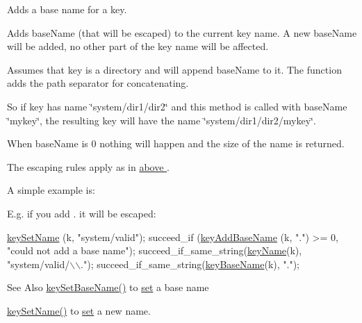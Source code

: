 Adds a base name for a key. 

Adds {\ttfamily base\-Name} (that will be escaped) to the current key name.  A new base\-Name will be added, no other part of the key name will be affected.

Assumes that {\ttfamily key} is a directory and will append {\ttfamily base\-Name} to it. The function adds the path separator for concatenating.

So if {\ttfamily key} has name {\ttfamily \char`\"{}system/dir1/dir2\char`\"{}} and this method is called with {\ttfamily base\-Name} {\ttfamily \char`\"{}mykey\char`\"{}}, the resulting key will have the name {\ttfamily \char`\"{}system/dir1/dir2/mykey\char`\"{}}.

When {\ttfamily base\-Name} is 0 nothing will happen and the size of the name is returned.

The escaping rules apply as in \hyperlink{group__keyname}{above }.

A simple example is\-: 
 E.\-g. if you add . it will be escaped\-: 
\begin{DoxyCodeInclude}
\hyperlink{group__keyname_ga7699091610e7f3f43d2949514a4b35d9}{keySetName} (k, \textcolor{stringliteral}{"system/valid"});
succeed\_if (\hyperlink{group__keyname_gaa942091fc4bd5c2699e49ddc50829524}{keyAddBaseName} (k, \textcolor{stringliteral}{"."}) >= 0, \textcolor{stringliteral}{"could not add a base
       name"});
succeed\_if\_same\_string(\hyperlink{group__keyname_ga8e805c726a60da921d3736cda7813513}{keyName}(k), \textcolor{stringliteral}{"system/valid/\(\backslash\)\(\backslash\)."});
succeed\_if\_same\_string(\hyperlink{group__keyname_gaaff35e7ca8af5560c47e662ceb9465f5}{keyBaseName}(k), \textcolor{stringliteral}{"."});
\end{DoxyCodeInclude}
 \begin{DoxySeeAlso}{See Also}
\hyperlink{group__keyname_ga6e804bd453f98c28b0ff51430d1df407}{key\-Set\-Base\-Name()} to \hyperlink{classkdb_1_1Key_a615124f0a2b291e03975b49c233654d7}{set} a base name 

\hyperlink{group__keyname_ga7699091610e7f3f43d2949514a4b35d9}{key\-Set\-Name()} to \hyperlink{classkdb_1_1Key_a615124f0a2b291e03975b49c233654d7}{set} a new name.
\end{DoxySeeAlso}

